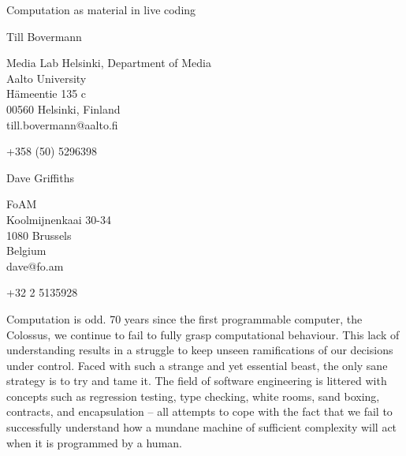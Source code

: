 \documentclass[letterpaper, 12pt]{article}
\begin{document}
{\cmjTitle 	Computation as material in live coding}
\vspace*{24pt}


{\cmjAuthor Till Bovermann}
\newline
\begin{cmjAuthorAddress}
	Media Lab Helsinki, Department of Media\\
	Aalto University\\
	H\"ameentie 135 c\\
	00560 Helsinki, Finland\\
	till.bovermann@aalto.fi
\end{cmjAuthorAddress}

\vspace*{24pt}
{\cmjAuthorPhone +358 (50) 5296398}
\vspace*{24pt}

{\cmjAuthor Dave Griffiths}
\newline
\begin{cmjAuthorAddress}
	FoAM\\
	Koolmijnenkaai 30-34\\
	1080 Brussels\\
	Belgium\\
	dave@fo.am
\end{cmjAuthorAddress}

\vspace*{24pt}
{\cmjAuthorPhone +32 2 5135928}
\vspace*{24pt}


\begin{abstract}
What does computation sound like, and how can process be integrated into live coding practice along with code?
This paper gives insights into three years of artistic research and performance practice with Betablocker, an imaginary CPU architecture, specifically designed and implemented for live coding purposes.
It covers the themes of algorithmic composition, sound generation, genetic programming and autonomous coding in the light of self-manipulating code and artistic research practice.
\end{abstract}

Computation is odd. 70 years since the first programmable computer, the Colossus, we continue to fail to fully grasp computational behaviour.
This lack of understanding results in a struggle to keep unseen ramifications of our decisions under control. Faced with such a strange and yet essential beast, the only sane strategy is to try and tame it.
The field of software engineering is littered with concepts such as regression testing, type checking, white rooms, sand boxing, contracts, and encapsulation -- all attempts to cope with the fact that we fail to successfully understand how a mundane machine of sufficient complexity will act when it is programmed by a human.
\end{document}
